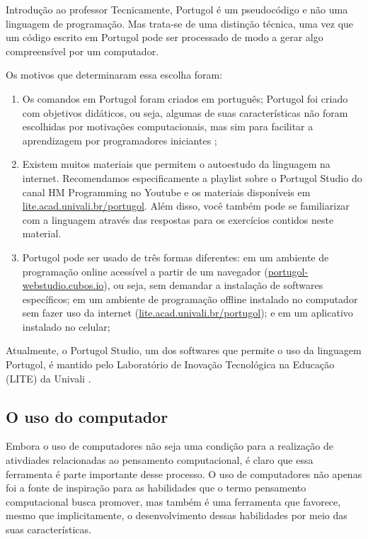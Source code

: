 \begin{apresentacao}{Introdução ao professor}
Tecnicamente, Portugol é um pseudocódigo e não uma linguagem de programação. Mas trata-se de uma distinção técnica, uma vez que um código escrito em Portugol pode ser processado de modo a gerar algo compreensível por um computador.

Os motivos que determinaram essa escolha foram:

\begin{enumerate}
\item Os comandos em Portugol foram criados em português;
Portugol foi criado com objetivos didáticos, ou seja, algumas de suas características não foram escolhidas por motivações computacionais, mas sim para facilitar a aprendizagem por programadores iniciantes \citep{noschang2014};

\item Existem muitos materiais que permitem o autoestudo da linguagem na internet. Recomendamos especificamente a playlist sobre o Portugol Studio do canal HM Programming no Youtube e os materiais disponíveis em \url{lite.acad.univali.br/portugol}. Além disso, você também pode se familiarizar com a linguagem através das respostas para os exercícios contidos neste material.

\item Portugol pode ser usado de três formas diferentes: em um ambiente de programação online acessível a partir de um navegador (\url{portugol-webstudio.cubos.io}), ou seja, sem demandar a instalação de softwares específicos; em um ambiente de programação offline instalado no computador sem fazer uso da internet (\url{lite.acad.univali.br/portugol}); e em um aplicativo instalado no celular;
\end{enumerate}

Atualmente, o Portugol Studio, um dos softwares que permite o uso da linguagem Portugol, é mantido pelo Laboratório de Inovação Tecnológica na Educação (LITE) da Univali \citep{esteves2019}.

\subsection{O uso do computador}

Embora o uso de computadores não seja uma condição para a realização de ativdiades relacionadas ao pensamento computacional, é claro que essa ferramenta é parte importante desse processo. O uso de computadores não apenas foi a fonte de inspiração para as habilidades que o termo pensamento computacional busca promover, mas também é uma ferramenta que favorece, mesmo que implicitamente, o desenvolvimento dessas habilidades por meio das suas características.


\end{apresentacao}
